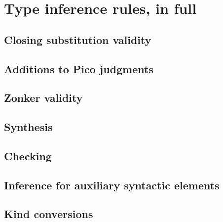 \chapter{Type inference rules, in full}
\label{app:inference-rules}

\renewcommand{\ottusedrule}[1]{\[#1\]\\[-1ex]}

\section{Closing substitution validity}

\ottdefnSubst{}

\section{Additions to Pico judgments}

\ottdefnUTy{}
\ottdefnUCo{}
\ottdefnUCtx{}

\section{Zonker validity}

\ottdefnZonk{}

\section{Synthesis}

\ottdefnIITy{}
\ottdefnIITyS{}

\section{Checking}
\label{sec:checking-judgments}

\ottdefnIITyDown{}
\ottdefnIITyDownS{}
\ottdefnIITyDownPoly{}

\section{Inference for auxiliary syntactic elements}

\ottdefnIIArg{}
\ottdefnIIAlt{}
\ottdefnIIAltC{}
\ottdefnIIQVar{}
\ottdefnIIAQVar{}
\ottdefnIIAQVarC{}
\ottdefnIIQuant{}

\section{Kind conversions}

\ottdefnIIFun{}
\ottdefnIIScrut{}

